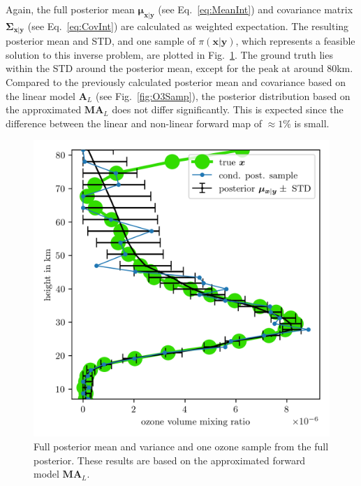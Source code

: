 Again, the full posterior mean $\bm{\mu}_{\bm{x}|\bm{y}}$ (see Eq.~\ref{eq:MeanInt}) and covariance matrix $\bm{\Sigma}_{ \bm{x}|\bm{y}}$ (see Eq.~\ref{eq:CovInt}) are calculated as weighted expectation.
The resulting posterior mean and STD, and one sample of $\pi(\bm{x}|\bm{y})$, which represents a feasible solution to this inverse problem, are plotted in Fig.~\ref{fig:O3SolplsReg}.
The ground truth lies within the STD around the posterior mean, except for the peak at around $80$km.
Compared to the previously calculated posterior mean and covariance based on the linear model $\bm{A}_L$ (see Fig.~\ref{fig:O3Samp}), the posterior distribution based on the approximated $\bm{M A}_L$ does not differ significantly.
This is expected since the difference between the linear and non-linear forward map of $\approx 1 \%$ is small.
\begin{figure}[ht!]
	\centering
	\includegraphics{SecRecResinclRegandSampl.png}
	\caption[Full posterior mean and variance of ozone and the regularised solution compared to the ground truth.]{Full posterior mean and variance and one ozone sample from the full posterior. These results are based on the approximated forward model $\bm{M}\bm{A}_L$.}
	\label{fig:O3SolplsReg}
\end{figure} 


